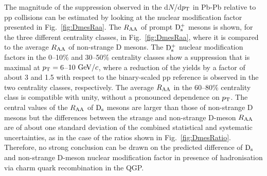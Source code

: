 The magnitude of the suppression observed in the d$N$/d$p_{\rm T}$ in Pb-Pb relative to pp collisions 
can be estimated by looking at the nuclear modification factor presented in Fig.~\ref{fig:DmesRaa}.
The $R_{\rm AA}$ of prompt ${\rm D_s^+}$ mesons is shown, for the three different centrality classes,
in Fig.~\ref{fig:DmesRaa}, where it is compared to the average $R_{\rm AA}$ of non-strange 
D mesons. The ${\rm D_s^+}$ nuclear modification factors in the 0--10\% 
and 30--50\% centrality classes show a suppression that is
maximal at $p_{\rm T}=6$--$10~\mathrm{GeV}/c$, where a reduction of the yields by
a factor of about 3 and 1.5 with respect to the binary-scaled
 pp reference is observed in the two centrality classes, respectively.
The average $R_{\rm AA}$ in the 60--80\% centrality class is compatible 
with unity, without a pronounced dependence on $p_{\rm T}$.
 The central values of the $R_{\rm AA}$ of ${\rm D_s}$ mesons are larger than those of non-strange D mesons but the 
differences between the strange and non-strange D-meson $R_{\rm AA}$ are 
of about one standard deviation of the combined statistical and systematic
uncertainties, as in the case of the ratios shown in Fig.~\ref{fig:DmesRatio}.
Therefore, no strong conclusion can be drawn on the predicted difference of ${\rm D_s}$ and 
non-strange D-meson nuclear modification factor in presence of hadronisation
via charm quark recombination in the QGP.\\




